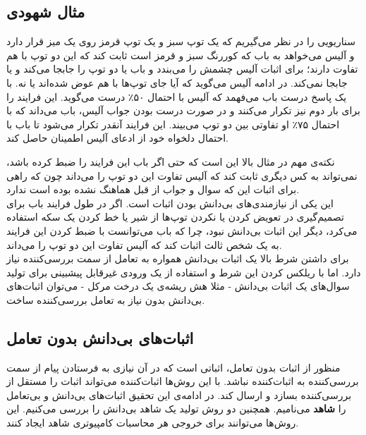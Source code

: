 \subsection{مثال شهودی}
سناریویی را در نظر می‌گیریم که یک توپ سبز و یک توپ قرمز روی یک میز قرار دارد و آلیس می‌خواهد به باب که کوررنگ سبز و قرمز است ثابت کند که این دو توپ با هم تفاوت دارند؛ برای اثبات آلیس چشمش را می‌بندد و باب یا دو توپ را جابجا می‌کند و یا جابجا نمی‌کند. در ادامه آلیس می‌گوید که آیا جای توپ‌ها با هم عوض شده‌اند یا نه. با یک پاسخ درست باب می‌فهمد که آلیس با احتمال ۵۰٪ درست می‌گوید. این فرایند را برای بار دوم نیز تکرار می‌کنند و در صورت درست بودن جواب آلیس، باب می‌داند که با احتمال ۷۵٪ او تفاوتی بین دو توپ می‌بیند. این فرایند آنقدر تکرار می‌شود تا باب با احتمال دلخواه خود از ادعای آلیس اطمینان حاصل کند.
\par
نکته‌ی مهم در مثال بالا این است که حتی اگر باب این فرایند را ضبط کرده باشد، نمی‌تواند به کس دیگری ثابت کند که آلیس تفاوت این دو توپ را می‌داند چون که راهی برای اثبات این که سوال و جواب از قبل هماهنگ نشده بوده است ندارد. 
\\
این یکی از نیازمندی‌های بی‌دانش بودن اثبات است. اگر در طول فرایند باب برای تصمیم‌گیری در تعویض کردن یا نکردن توپ‌ها از شیر یا خط کردن یک سکه استفاده می‌کرد، دیگر این اثبات بی‌دانش نبود، چرا که باب می‌توانست با ضبط کردن این فرایند به یک شخص ثالث اثبات کند که آلیس تفاوت این دو توپ را می‌داند. 
\\
برای داشتن شرط بالا یک اثبات بی‌دانش همواره به تعامل از سمت بررسی‌کننده نیاز دارد. اما با ریلکس کردن این شرط و استفاده از یک ورودی غیرقابل پیشبینی برای تولید سوال‌های یک اثبات بی‌دانش - مثلا هش ریشه‌ی یک درخت مرکل - می‌توان اثبات‌های بی‌دانش بدون نیاز به تعامل بررسی‌کننده ساخت. 


\subsection{اثبات‌های بی‌دانش بدون تعامل} 
منظور از اثبات بدون تعامل، اثباتی‌ است که در آن نیازی به فرستادن پیام از سمت بررسی‌کننده به اثبات‌کننده نباشد. با این روش‌ها اثبات‌کننده می‌تواند اثبات را مستقل از بررسی‌کننده بسازد و ارسال کند. در ادامه‌ی این تحقیق اثبات‌های بی‌دانش و بی‌تعامل را 
\textbf{شاهد}
می‌نامیم. همچنین دو روش تولید یک شاهد بی‌دانش را بررسی می‌کنیم. این روش‌ها می‌توانند برای خروجی هر محاسبات کامپیوتری شاهد ایجاد کنند. 

